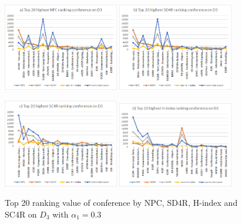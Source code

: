\documentclass[10pt,leqno,twoside]{article}
\begin{document}
\begin{figure} %
	\caption{Top 20 ranking value of conference by NPC, SD4R, H-index and SC4R on $D_3$ with $\alpha_1=0.3$}
	\label{Fig:Top20ConferenceD3}
    \centering
    \includegraphics[width=0.45\textwidth]{D3t20cNPC}    
    \includegraphics[width=0.45\textwidth]{D3t20cSD4R}
     
    \includegraphics[width=0.45\textwidth]{D3t20cSC4R}
    \includegraphics[width=0.45\textwidth]{D3t20cHindex}
\end{figure}
\end{document}
